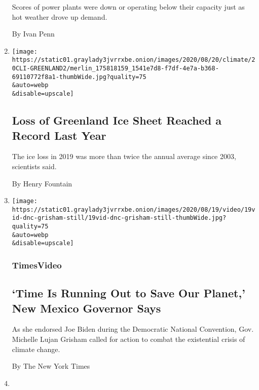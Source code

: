 \begin{enumerate}
  Scores of power plants were down or operating below their capacity
  just as hot weather drove up demand.

  By Ivan Penn
\item
  \href{/2020/08/20/climate/greenland-ice-loss-climate-change.html}{}

  \texttt{[image: https://static01.graylady3jvrrxbe.onion/images/2020/08/20/climate/20CLI-GREENLAND2/merlin\_175818159\_1541e7d8-f7df-4e7a-b368-69110772f8a1-thumbWide.jpg?quality=75\\\&auto=webp\\\&disable=upscale]}

  \hypertarget{loss-of-greenland-ice-sheet-reached-a-record-last-year}{%
  \subsection{Loss of Greenland Ice Sheet Reached a Record Last
  Year}\label{loss-of-greenland-ice-sheet-reached-a-record-last-year}}

  The ice loss in 2019 was more than twice the annual average since
  2003, scientists said.

  By Henry Fountain
\item
  \href{/video/us/elections/100000007297726/michelle-lujan-grisham-speaks-dnc.html}{}

  \texttt{[image: https://static01.graylady3jvrrxbe.onion/images/2020/08/19/video/19vid-dnc-grisham-still/19vid-dnc-grisham-still-thumbWide.jpg?quality=75\\\&auto=webp\\\&disable=upscale]}

  \hypertarget{timesvideo-1}{%
  \subsubsection{TimesVideo}\label{timesvideo-1}}

  \hypertarget{time-is-running-out-to-save-our-planet-new-mexico-governor-says}{%
  \subsection{`Time Is Running Out to Save Our Planet,' New Mexico
  Governor
  Says}\label{time-is-running-out-to-save-our-planet-new-mexico-governor-says}}

  As she endorsed Joe Biden during the Democratic National Convention,
  Gov. Michelle Lujan Grisham called for action to combat the
  existential crisis of climate change.

  By The New York Times
\item
  \href{/2020/08/19/climate/earth-overshoot-day.html}{}


\end{enumerate}
